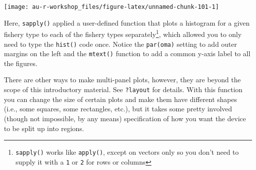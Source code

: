 \documentclass[]{book}
\newenvironment{Shaded}{\begin{snugshade}}{\end{snugshade}}
\newcommand{\ControlFlowTok}[1]{\textcolor[rgb]{0.13,0.29,0.53}{\textbf{#1}}}
\newcommand{\DataTypeTok}[1]{\textcolor[rgb]{0.13,0.29,0.53}{#1}}
\newcommand{\DecValTok}[1]{\textcolor[rgb]{0.00,0.00,0.81}{#1}}
\newcommand{\FloatTok}[1]{\textcolor[rgb]{0.00,0.00,0.81}{#1}}
\newcommand{\KeywordTok}[1]{\textcolor[rgb]{0.13,0.29,0.53}{\textbf{#1}}}
\newcommand{\NormalTok}[1]{#1}
\newcommand{\OperatorTok}[1]{\textcolor[rgb]{0.81,0.36,0.00}{\textbf{#1}}}
\newcommand{\StringTok}[1]{\textcolor[rgb]{0.31,0.60,0.02}{#1}}
\let\rmarkdownfootnote\footnote%
\def\footnote{\protect\rmarkdownfootnote}
\begin{document}
\begin{Shaded}
\end{Shaded}

\begin{center}\texttt{[image: au-r-workshop\_files/figure-latex/unnamed-chunk-101-1]} \end{center}

Here, \texttt{sapply()} applied a user-defined function that plots a histogram for a given fishery type to each of the fishery types separately\footnote{\texttt{sapply()} works like \texttt{apply()}, except on vectors only so you don't need to supply it with a \texttt{1} or \texttt{2} for rows or columns}, which allowed you to only need to type the \texttt{hist()} code once. Notice the \texttt{par(oma)} setting to add outer margins on the left and the \texttt{mtext()} function to add a common y-axis label to all the figures.

There are other ways to make multi-panel plots, however, they are beyond the scope of this introductory material. See \texttt{?layout} for details. With this function you can change the size of certain plots and make them have different shapes (i.e., some squares, some rectangles, etc.), but it takes some pretty involved (though not impossible, by any means) specification of how you want the device to be split up into regions.
\end{document}
